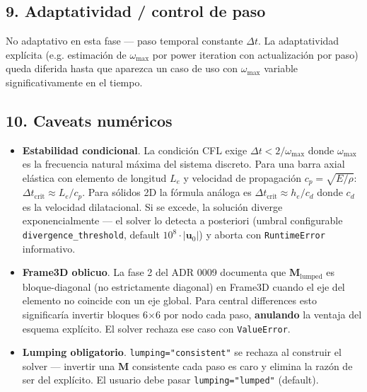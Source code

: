 \documentclass[11pt,letterpaper,oneside]{report}
\begin{document}
\subsection{9. Adaptatividad / control de paso}

No adaptativo en esta fase --- paso temporal constante $\Delta t$. La adaptatividad explícita (e.g. estimación de $\omega_{\max}$ por power iteration con actualización por paso) queda diferida hasta que aparezca un caso de uso con $\omega_{\max}$ variable significativamente en el tiempo.

\subsection{10. Caveats numéricos}

\begin{itemize}
  \item \textbf{Estabilidad condicional}. La condición CFL exige $\Delta t < 2/\omega_{\max}$ donde $\omega_{\max}$ es la frecuencia natural máxima del sistema discreto. Para una barra axial elástica con elemento de longitud $L_e$ y velocidad de propagación $c_p = \sqrt{E/\rho}$: $\Delta t_\text{crit} \approx L_e/c_p$. Para sólidos 2D la fórmula análoga es $\Delta t_\text{crit} \approx h_e/c_d$ donde $c_d$ es la velocidad dilatacional. Si se excede, la solución diverge exponencialmente --- el solver lo detecta a posteriori (umbral configurable \texttt{divergence\_threshold}, default $10^8 \cdot |\mathbf{u}_0|$) y aborta con \texttt{RuntimeError} informativo.
\end{itemize}

\begin{itemize}
  \item \textbf{Frame3D oblicuo}. La fase 2 del ADR 0009 documenta que $\mathbf{M}_\text{lumped}$ es bloque-diagonal (no estrictamente diagonal) en Frame3D cuando el eje del elemento no coincide con un eje global. Para central differences esto significaría invertir bloques 6\ensuremath{\times}6 por nodo cada paso, \textbf{anulando} la ventaja del esquema explícito. El solver rechaza ese caso con \texttt{ValueError}.
\end{itemize}

\begin{itemize}
  \item \textbf{Lumping obligatorio}. \texttt{lumping="consistent"} se rechaza al construir el solver --- invertir una $\mathbf{M}$ consistente cada paso es caro y elimina la razón de ser del explícito. El usuario debe pasar \texttt{lumping="lumped"} (default).
\end{itemize}
\end{document}
